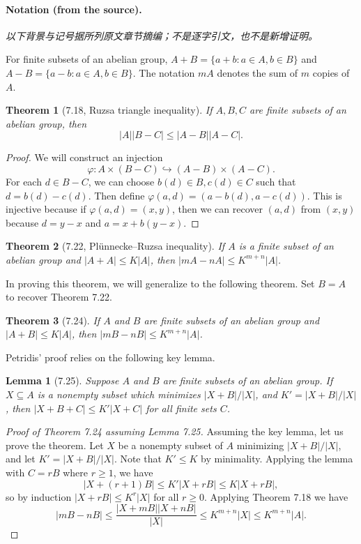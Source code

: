 \documentclass[UTF8,11pt]{ctexart}
\newtheorem*{theorem}{Theorem}
\newtheorem*{lemma}{Lemma}
\theoremstyle{definition}
\begin{document}
\paragraph{Notation (from the source).}
\noindent\textit{以下背景与记号据所列原文章节摘编；不是逐字引文，也不是新增证明。}\par For finite subsets of an abelian group, $A+B=\{a+b:a\in A,b\in B\}$ and $A-B=\{a-b:a\in A,b\in B\}$. The notation $mA$ denotes the sum of $m$ copies of $A$.
\begin{theorem}[7.18, Ruzsa triangle inequality]
If $A,B,C$ are finite subsets of an abelian group, then
\[|A||B-C|\leq |A-B||A-C|.\]
\end{theorem}
\begin{proof}
We will construct an injection
\[\varphi:A\times(B-C)\hookrightarrow(A-B)\times(A-C).\]
For each $d\in B-C$, we can choose $b(d)\in B,c(d)\in C$ such that $d=b(d)-c(d)$. Then define $\varphi(a,d)=(a-b(d),a-c(d))$. This is injective because if $\varphi(a,d)=(x,y)$, then we can recover $(a,d)$ from $(x,y)$ because $d=y-x$ and $a=x+b(y-x)$.
\end{proof}
\begin{theorem}[7.22, Pl\"unnecke--Ruzsa inequality]
If $A$ is a finite subset of an abelian group and $|A+A|\leq K|A|$, then $|mA-nA|\leq K^{m+n}|A|$.
\end{theorem}
In proving this theorem, we will generalize to the following theorem. Set $B=A$ to recover Theorem 7.22.
\begin{theorem}[7.24]
If $A$ and $B$ are finite subsets of an abelian group and $|A+B|\leq K|A|$, then $|mB-nB|\leq K^{m+n}|A|$.
\end{theorem}
Petridis' proof relies on the following key lemma.
\begin{lemma}[7.25]
Suppose $A$ and $B$ are finite subsets of an abelian group. If $X\subseteq A$ is a nonempty subset which minimizes $|X+B|/|X|$, and $K'=|X+B|/|X|$, then $|X+B+C|\leq K'|X+C|$ for all finite sets $C$.
\end{lemma}
\begin{proof}[Proof of Theorem 7.24 assuming Lemma 7.25]
Assuming the key lemma, let us prove the theorem. Let $X$ be a nonempty subset of $A$ minimizing $|X+B|/|X|$, and let $K'=|X+B|/|X|$. Note that $K'\leq K$ by minimality. Applying the lemma with $C=rB$ where $r\geq1$, we have
\[|X+(r+1)B|\leq K'|X+rB|\leq K|X+rB|,\]
so by induction $|X+rB|\leq K^r|X|$ for all $r\geq0$. Applying Theorem 7.18 we have
\[|mB-nB|\leq\frac{|X+mB||X+nB|}{|X|}\leq K^{m+n}|X|\leq K^{m+n}|A|.\]
\end{proof}
\end{document}
